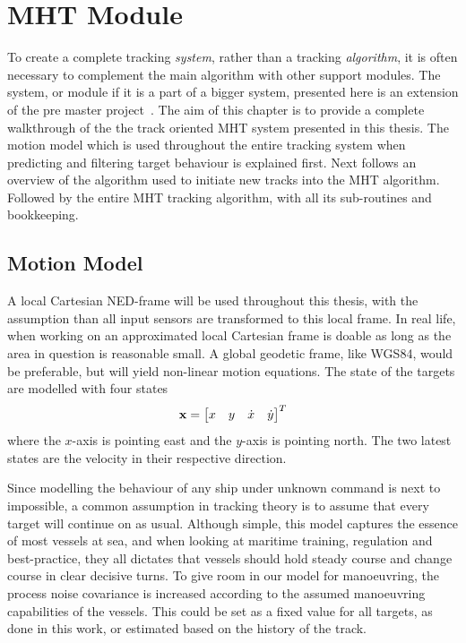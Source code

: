 
\chapter{MHT Module}\label{chapter:mht-module}
To create a complete tracking \emph{system}, rather than a tracking \emph{algorithm}, it is often necessary  to complement the main algorithm with other support modules. The system, or module if it is a part of a bigger system, presented here is an extension of the pre master project~\cite{Liland_2017}. The aim of this chapter is to provide a complete walkthrough of the the track oriented MHT system presented in this thesis. The motion model which is used throughout the entire tracking system when predicting and filtering target behaviour is explained first. Next follows an overview of the algorithm used to initiate new tracks into the MHT algorithm. Followed by the entire MHT tracking algorithm, with all its sub-routines and bookkeeping.

\section{Motion Model}\label{sec:motion-model}
A local Cartesian NED-frame will be used throughout this thesis, with the assumption than all input sensors are transformed to this local frame. In real life, when working on an approximated local Cartesian frame is doable as long as the area in question is reasonable small. A global geodetic frame, like WGS84, would be preferable, but will yield non-linear motion equations. The state of the targets are modelled with four states
\begin{equation}
\boldsymbol{\mathbf{x}} = \begin{bmatrix}
x & y & \dot{x} & \dot{y}
\end{bmatrix}^T
\label{eq:state_vector}
\end{equation}
where the \(x\)-axis is pointing east and the \(y\)-axis is pointing north. The two latest states are the velocity in their respective direction. 

Since modelling the behaviour of any ship under unknown command is next to impossible, a common assumption in tracking theory is to assume that every target will continue on as usual. Although simple, this model captures the essence of most vessels at sea, and when looking at maritime training, regulation and best-practice, they all dictates that vessels should hold steady course and change course in clear decisive turns. To give room in our model for manoeuvring, the process noise covariance is increased according to the assumed manoeuvring capabilities of the vessels. This could be set as a fixed value for all targets, as done in this work, or estimated based on the history of the track.

